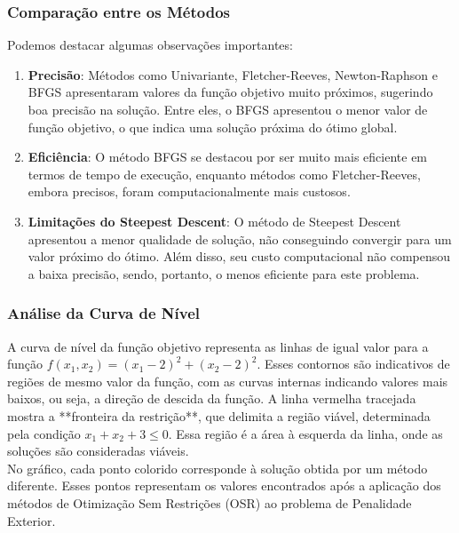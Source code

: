 \documentclass[a4paper, 12pt]{article}
\begin{document}
\subsubsection*{Comparação entre os Métodos}

Podemos destacar algumas observações importantes:

\begin{enumerate}
    \item \textbf{Precisão}: Métodos como Univariante, Fletcher-Reeves, Newton-Raphson e BFGS apresentaram valores da função objetivo muito próximos, sugerindo boa precisão na solução. Entre eles, o BFGS apresentou o menor valor de função objetivo, o que indica uma solução próxima do ótimo global.
    \item \textbf{Eficiência}: O método BFGS se destacou por ser muito mais eficiente em termos de tempo de execução, enquanto métodos como Fletcher-Reeves, embora precisos, foram computacionalmente mais custosos.
    \item \textbf{Limitações do Steepest Descent}: O método de Steepest Descent apresentou a menor qualidade de solução, não conseguindo convergir para um valor próximo do ótimo. Além disso, seu custo computacional não compensou a baixa precisão, sendo, portanto, o menos eficiente para este problema.
\end{enumerate}

\subsubsection*{Análise da Curva de Nível}

A curva de nível da função objetivo representa as linhas de igual valor para a função \( f(x_1, x_2) = (x_1 - 2)^2 + (x_2 - 2)^2 \). Esses contornos são indicativos de regiões de mesmo valor da função, com as curvas internas indicando valores mais baixos, ou seja, a direção de descida da função. A linha vermelha tracejada mostra a **fronteira da restrição**, que delimita a região viável, determinada pela condição \( x_1 + x_2 + 3 \leq 0 \). Essa região é a área à esquerda da linha, onde as soluções são consideradas viáveis.\\

No gráfico, cada ponto colorido corresponde à solução obtida por um método diferente. Esses pontos representam os valores encontrados após a aplicação dos métodos de Otimização Sem Restrições (OSR) ao problema de Penalidade Exterior.\\
\end{document}
